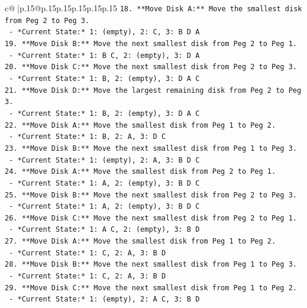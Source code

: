\documentclass{article}
\begin{document}
{\begin{supertabular}{c@{$\;$}|p{.15\linewidth}@{}p{.15\linewidth}p{.15\linewidth}p{.15\linewidth}p{.15\linewidth}p{.15\linewidth}}
{{{\texttt{18. **Move Disk A:** Move the smallest disk from Peg 2 to Peg 3.} \\
\texttt{    {-}   *Current State:* 1: (empty), 2: C, 3: B D A} \\
\texttt{19. **Move Disk B:** Move the next smallest disk from Peg 2 to Peg 1.} \\
\texttt{    {-}   *Current State:* 1: B C, 2: (empty), 3: D A} \\
\texttt{20. **Move Disk C:** Move the next smallest disk from Peg 2 to Peg 3.} \\
\texttt{    {-}   *Current State:* 1: B, 2: (empty), 3: D A C} \\
\texttt{21. **Move Disk D:** Move the largest remaining disk from Peg 2 to Peg 3.} \\
\texttt{    {-}   *Current State:* 1: B, 2: (empty), 3: D A C} \\
\texttt{22. **Move Disk A:** Move the smallest disk from Peg 1 to Peg 2.} \\
\texttt{    {-}   *Current State:* 1: B, 2: A, 3: D C} \\
\texttt{23. **Move Disk B:** Move the next smallest disk from Peg 1 to Peg 3.} \\
\texttt{    {-}   *Current State:* 1: (empty), 2: A, 3: B D C} \\
\texttt{24. **Move Disk A:** Move the smallest disk from Peg 2 to Peg 1.} \\
\texttt{    {-}   *Current State:* 1: A, 2: (empty), 3: B D C} \\
\texttt{25. **Move Disk B:** Move the next smallest disk from Peg 2 to Peg 3.} \\
\texttt{    {-}   *Current State:* 1: A, 2: (empty), 3: B D C} \\
\texttt{26. **Move Disk C:** Move the next smallest disk from Peg 2 to Peg 1.} \\
\texttt{    {-}   *Current State:* 1: A C, 2: (empty), 3: B D} \\
\texttt{27. **Move Disk A:** Move the smallest disk from Peg 1 to Peg 2.} \\
\texttt{    {-}   *Current State:* 1: C, 2: A, 3: B D} \\
\texttt{28. **Move Disk B:** Move the next smallest disk from Peg 1 to Peg 3.} \\
\texttt{    {-}   *Current State:* 1: C, 2: A, 3: B D} \\
\texttt{29. **Move Disk C:** Move the next smallest disk from Peg 1 to Peg 2.} \\
\texttt{    {-}   *Current State:* 1: (empty), 2: A C, 3: B D} \\
}}}
\end{supertabular}}
\end{document}

